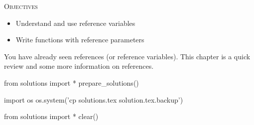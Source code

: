 
\textsc{Objectives}
\begin{itemize}
\item Understand and use reference variables
\item Write functions with reference parameters
\end{itemize}

You have already seen references (or reference variables). This chapter is a quick review and some more information on references.









\begin{python0}
from solutions import *
prepare_solutions()
\end{python0}
\begin{python}
import os
os.system('cp solutions.tex solution.tex.backup')  
\end{python}

\begin{python0}
from solutions import *
clear()
\end{python0}
